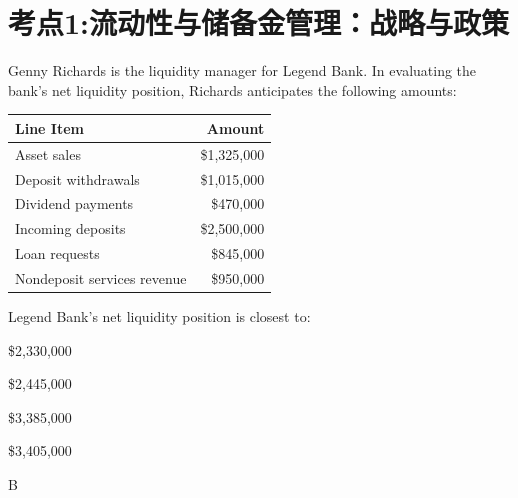 \documentclass{article}
\newcounter{question} %
\begin{document}
 \tableofcontents %
\newpage




\section{考点1:流动性与储备金管理：战略与政策}
\setcounter{question}{0}

\begin{question}
    Genny Richards is the liquidity manager for Legend Bank. In evaluating the bank's net liquidity position, Richards anticipates the following amounts:

    \begin{table}[htbp]
        \centering
        \begin{tabular}{|l|r|}
            \hline
            \textbf{Line Item} & \textbf{Amount} \\
            \hline
            Asset sales & \$1,325,000 \\
            Deposit withdrawals & \$1,015,000 \\
            Dividend payments & \$470,000 \\
            Incoming deposits & \$2,500,000 \\
            Loan requests & \$845,000 \\
            Nondeposit services revenue & \$950,000 \\
            \hline
        \end{tabular}
    \end{table}
    Legend Bank's net liquidity position is closest to:
\end{question}

\begin{choices}
    \item \$2,330,000
    \item \$2,445,000
    \item \$3,385,000
    \item \$3,405,000
\end{choices}

\begin{correctanswer}
    B
\end{correctanswer}
\end{document}
